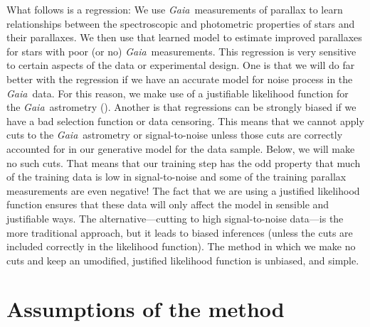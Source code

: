 \documentclass[modern]{aastex62}
\newcommand{\project}[1]{\textsl{#1}}
\newcommand{\gaia}{\project{Gaia}}
\begin{document}
What follows is a regression:
We use \gaia\ measurements of parallax to learn relationships between 
the spectroscopic and photometric properties of stars and their parallaxes.
We then use that learned model to estimate improved parallaxes for stars with
poor (or no) \gaia\ measurements.
This regression is very sensitive to certain aspects of the data or experimental
design.
One is that we will do far better with the regression if we have an accurate
model for noise process in the \gaia\ data.
For this reason, we make use of a justifiable likelihood function for the
\gaia\ astrometry (\citealt{gaialf}).
Another is that regressions can be strongly biased if we have a bad selection function
or data censoring.
This means that we cannot apply cuts to the \gaia\ astrometry or signal-to-noise
unless those cuts are correctly accounted for in our generative model for the
data sample.
Below, we will make no such cuts. That means that our training step has the odd
property that much of the training data is low in signal-to-noise and some of the
training parallax measurements are even negative!
The fact that we are using a justified likelihood function ensures that these
data will only affect the model in sensible and justifiable ways.
The alternative---cutting to high signal-to-noise data---is the more traditional
approach, but it leads to biased inferences (unless the cuts are included correctly
in the likelihood function).
The method in which we make no cuts and keep an umodified, justified likelihood function
is unbiased, and simple.

\section{Assumptions of the method}\label{sec:assumptions}
\end{document}
